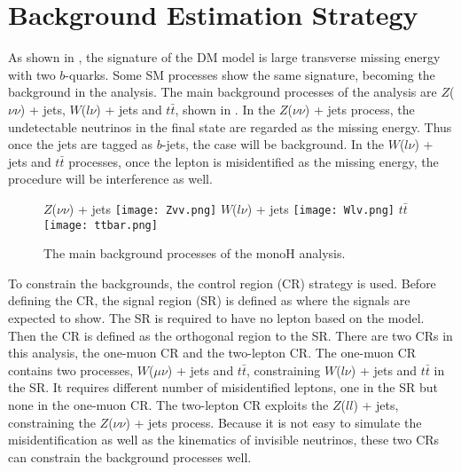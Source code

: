 \documentclass[class=NTHU_thesis, crop=false]{standalone}
\begin{document}
\chapter{Background Estimation Strategy}
\label{chap:estimation_strategy}
As shown in , the signature of the DM model is large transverse missing energy with two $b$-quarks. Some SM processes show the same signature, becoming the background in the analysis. The main background processes of the analysis are $Z$($\nu\nu$) + jets, $W$($l\nu$) + jets and $t\bar{t}$, shown in . In the $Z$($\nu\nu$) + jets process, the undetectable neutrinos in the final state are regarded as the missing energy. Thus once the jets are tagged as $b$-jets, the case will be background. In the $W$($l\nu$) + jets and $t\bar{t}$ processes, once the lepton is misidentified as the missing energy, the procedure will be interference as well.

\begin{figure}[!hbt]
	\captionsetup[subfigure]{labelformat=empty}
	\centering
	\subcaptionbox
	{$Z$($\nu\nu$) + jets
		\label{fig:Bkg-Processes-fig1}}
		{\texttt{[image: Zvv.png]}}
	\subcaptionbox
	{$W$($l\nu$) + jets
		\label{fig:Bkg-Processes-fig2}}
		{\texttt{[image: Wlv.png]}}
	\subcaptionbox
	{$t\bar{t}$
		\label{fig:Bkg-Processes-fig3}}
		{\texttt{[image: ttbar.png]}}
	\caption{The main background processes of the monoH analysis.}
	\label{fig:Bkg-Processes}
\end{figure}

To constrain the backgrounds, the control region (CR) strategy is used. Before defining the CR, the signal region (SR) is defined as where the signals are expected to show. The SR is required to have no lepton based on the model. Then the CR is defined as the orthogonal region to the SR. There are two CRs in this analysis, the one-muon CR and the two-lepton CR. The one-muon CR contains two processes, $W$($\mu\nu$) + jets and $t\bar{t}$, constraining $W$($l\nu$) + jets and $t\bar{t}$ in the SR. It requires different number of misidentified leptons, one in the SR but none in the one-muon CR. The two-lepton CR exploits the $Z$($ll$) + jets, constraining the $Z$($\nu\nu$) + jets process. Because it is not easy to simulate the misidentification as well as the kinematics of invisible neutrinos, these two CRs can constrain the background processes well.
\end{document}
